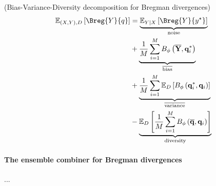 \documentclass[../main.tex]{subfiles}
\begin{document}
\begin{theorem} (Bias-Variance-Diversity decomposition for Bregman divergences)
    \label{thm:bregman-diversity-decomp}
\begin{align*}
\mathbb{E}_{(X,Y), D}\left[ \Breg{Y}{q} \right]  
&= \underbrace{\mathbb{E}_{Y|X}\left[ \Breg{Y}{y^\star} \right]   }_{\text{noise}} \\
&+
\underbrace{
    \frac{1}{M} \sum_{i=1}^M B_\phi\left(\overline{\mathbf{Y}}, \mathbf{q}_i^*\right)
}_{\overline{\text{bias}}} \\
&+
\underbrace{
    \frac{1}{M} \sum_{i=1}^M \mathbb{E}_D\left[B_\phi\left(\mathbf{q}_i^*, \mathbf{q}_i\right)\right]
}_{\overline{\text{variance}}} \\
&-
\underbrace{
    \mathbb{E}_D\left[\frac{1}{M} \sum_{i=1}^M B_\phi\left(\overline{\mathbf{q}}, \mathbf{q}_i\right)\right]
}_{\text{diversity}}
\end{align*}
\end{theorem}



\paragraph{The ensemble combiner for Bregman divergences} ...




\end{document}
